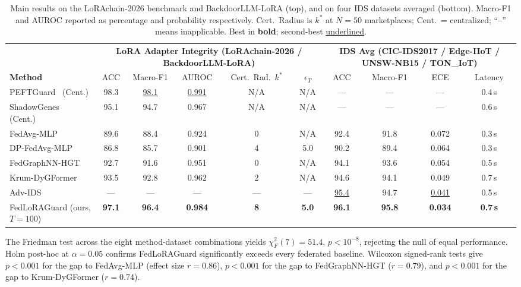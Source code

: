 \documentclass[12pt,a4paper]{article}
\theoremstyle{definition}
\theoremstyle{remark}
\newcommand{\modelname}{FedLoRAGuard}
\newcommand{\benchname}{LoRAchain-2026}
\begin{document}
\begin{table}[!t]
\centering
\caption{Main results on the \benchname{} benchmark and BackdoorLLM-LoRA (top), and on four IDS datasets averaged (bottom). Macro-F1 and AUROC reported as percentage and probability respectively. Cert.\ Radius is $k^*$ at $N = 50$ marketplaces; Cent.\ = centralized; ``--'' means inapplicable. Best in \textbf{bold}; second-best \underline{underlined}.}
\label{tab:main}
\small
\begin{tabular}{@{}lccccc|cccc@{}}
\toprule
& \multicolumn{5}{c|}{\textbf{LoRA Adapter Integrity (\benchname{} / BackdoorLLM-LoRA)}} & \multicolumn{4}{c}{\textbf{IDS Avg (CIC-IDS2017 / Edge-IIoT / UNSW-NB15 / TON\_IoT)}} \\
\cmidrule(lr){2-6}\cmidrule(lr){7-10}
\textbf{Method} & ACC & Macro-F1 & AUROC & Cert.\ Rad.\ $k^*$ & $\epsilon_T$ & ACC & Macro-F1 & ECE & Latency \\
\midrule
PEFTGuard~\cite{sun2025peftguard} (Cent.) & 98.3 & \underline{98.1} & \underline{0.991} & N/A & N/A & --- & --- & --- & 0.4\,s \\
ShadowGenes~\cite{schulz2025shadowgenes} (Cent.) & 95.1 & 94.7 & 0.967 & N/A & N/A & --- & --- & --- & 0.6\,s \\
FedAvg-MLP & 89.6 & 88.4 & 0.924 & 0 & N/A & 92.4 & 91.8 & 0.072 & 0.3\,s \\
DP-FedAvg-MLP & 86.8 & 85.7 & 0.901 & 4 & 5.0 & 90.2 & 89.4 & 0.064 & 0.3\,s \\
FedGraphNN-HGT~\cite{he2021fedgraphnn} & 92.7 & 91.6 & 0.951 & 0 & N/A & 94.1 & 93.6 & 0.054 & 0.5\,s \\
Krum-DyGFormer & 93.5 & 92.8 & 0.962 & 2 & N/A & 94.6 & 94.1 & 0.049 & 0.7\,s \\
Adv-IDS~\cite{anaedevha2024adversarial} & --- & --- & --- & --- & --- & \underline{95.4} & 94.7 & \underline{0.041} & 0.5\,s \\
\midrule
\modelname{} (ours, $T=100$) & \textbf{97.1} & \textbf{96.4} & \textbf{0.984} & \textbf{8} & \textbf{5.0} & \textbf{96.1} & \textbf{95.8} & \textbf{0.034} & \textbf{0.7\,s} \\
\bottomrule
\end{tabular}
\end{table}

The Friedman test across the eight method-dataset combinations yields $\chi_F^2(7) = 51.4$, $p < 10^{-8}$, rejecting the null of equal performance. Holm post-hoc at $\alpha = 0.05$ confirms \modelname{} significantly exceeds every federated baseline. Wilcoxon signed-rank tests give $p < 0.001$ for the gap to FedAvg-MLP (effect size $r = 0.86$), $p < 0.001$ for the gap to FedGraphNN-HGT ($r = 0.79$), and $p < 0.001$ for the gap to Krum-DyGFormer ($r = 0.74$).
\end{document}
